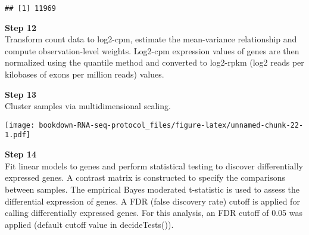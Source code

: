 \documentclass[]{book}
\newenvironment{Shaded}{\begin{snugshade}}{\end{snugshade}}
\newcommand{\DataTypeTok}[1]{\textcolor[rgb]{0.13,0.29,0.53}{#1}}
\newcommand{\DecValTok}[1]{\textcolor[rgb]{0.00,0.00,0.81}{#1}}
\newcommand{\KeywordTok}[1]{\textcolor[rgb]{0.13,0.29,0.53}{\textbf{#1}}}
\newcommand{\NormalTok}[1]{#1}
\newcommand{\OperatorTok}[1]{\textcolor[rgb]{0.81,0.36,0.00}{\textbf{#1}}}
\newcommand{\StringTok}[1]{\textcolor[rgb]{0.31,0.60,0.02}{#1}}
\begin{document}
\begin{verbatim}
## [1] 11969
\end{verbatim}

\textbf{Step 12}\\
Transform count data to log2-cpm, estimate the mean-variance relationship and compute observation-level weights. Log2-cpm expression values of genes are then normalized using the quantile method and converted to log2-rpkm (log2 reads per kilobases of exons per million reads) values.

\begin{Shaded}
\end{Shaded}

\textbf{Step 13}\\
Cluster samples via multidimensional scaling.

\begin{Shaded}
\end{Shaded}

\texttt{[image: bookdown-RNA-seq-protocol\_files/figure-latex/unnamed-chunk-22-1.pdf]}

\textbf{Step 14}\\

Fit linear models to genes and perform statistical testing to discover differentially expressed genes. A contrast matrix is constructed to specify the comparisons between samples. The empirical Bayes moderated t-statistic is used to assess the differential expression of genes. A FDR (false discovery rate) cutoff is applied for calling differentially expressed genes. For this analysis, an FDR cutoff of 0.05 was applied (default cutoff value in decideTests()).
\end{document}
